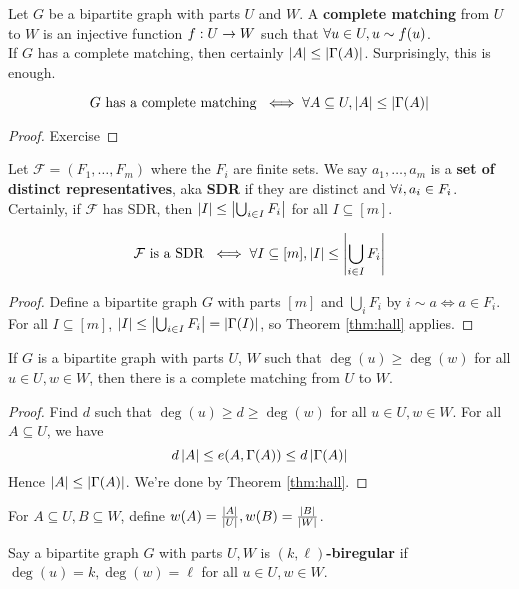 \documentclass{article}
\begin{document}
Let $G$ be a bipartite graph with parts $U$ and $W$. A {\bf complete matching} from $U$ to $W$ is an injective function $f : U \rightarrow W$ such that $\forall u \in U, u \sim f(u)$. \\
If $G$ has a complete matching, then certainly $\left\lvert A\right\rvert \le \left\lvert \Gamma(A)\right\rvert$. Surprisingly, this is enough.

\begin{nthm}\label{thm:hall}
  $$G \text{ has a complete matching } \iff \forall A \subseteq U, \left\lvert A\right\rvert \le \left\lvert \Gamma(A)\right\rvert$$
\end{nthm}
\begin{proof}
  Exercise
\end{proof}

Let $\mathcal F = (F_1, \dots, F_m)$ where the $F_i$ are finite sets. We say $a_1, \dots, a_m$ is a {\bf set of distinct representatives}, aka {\bf SDR} if they are distinct and $\forall i, a_i \in F_i$. Certainly, if $\mathcal F$ has SDR, then $\left\lvert I\right\rvert \le \left\lvert \bigcup_{i \in I} F_i\right\rvert$ for all $I \subseteq [m]$.

\begin{nthm}
  $$\mathcal F \text{ is a SDR } \iff \forall I \subseteq [m], \left\lvert I\right\rvert \le \left\lvert \bigcup_{i \in I} F_i\right\rvert$$
\end{nthm}
\begin{proof}
  Define a bipartite graph $G$ with parts $[m]$ and $\bigcup_i F_i$ by $i \sim a \iff a \in F_i$. For all $I \subseteq [m]$, $\left\lvert I\right\rvert \le \left\lvert \bigcup_{i \in I} F_i\right\rvert = \left\lvert \Gamma(I)\right\rvert$, so Theorem \ref{thm:hall} applies.
\end{proof}

\begin{nthm}
  If $G$ is a bipartite graph with parts $U$, $W$ such that $\deg(u) \ge \deg(w)$ for all $u \in U, w \in W$, then there is a complete matching from $U$ to $W$.
\end{nthm}
\begin{proof}
  Find $d$ such that $\deg(u) \ge d \ge \deg(w)$ for all $u \in U, w \in W$. For all $A \subseteq U$, we have
  $$d\left\lvert A\right\rvert \le e(A, \Gamma(A)) \le d\left\lvert \Gamma(A)\right\rvert$$
  Hence $\left\lvert A\right\rvert \le \left\lvert \Gamma(A)\right\rvert$. We're done by Theorem \ref{thm:hall}.
\end{proof}

For $A \subseteq U, B \subseteq W$, define $w(A) = \frac{\left\lvert A\right\rvert}{\left\lvert U\right\rvert}, w(B) = \frac{\left\lvert B\right\rvert}{\left\lvert W\right\rvert}$.

Say a bipartite graph $G$ with parts $U, W$ is {\bf $(k, \ell)$-biregular} if
$\deg(u) = k, \deg(w) = \ell$ for all $u \in U, w \in W$.
\end{document}
